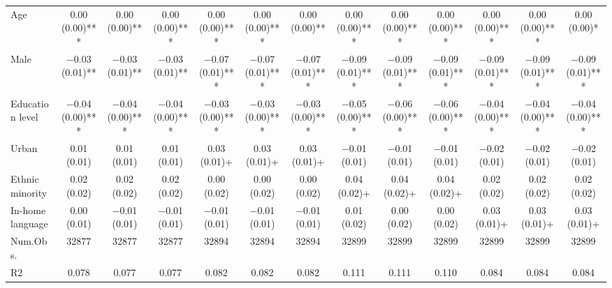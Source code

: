 \begin{table}
\begin{tabular}[t]{lcccccccccccc}
Age & \num{0.00} (\num{0.00})*** & \num{0.00} (\num{0.00})** & \num{0.00} (\num{0.00})*** & \num{0.00} (\num{0.00})*** & \num{0.00} (\num{0.00})*** & \num{0.00} (\num{0.00})** & \num{0.00} (\num{0.00})*** & \num{0.00} (\num{0.00})*** & \num{0.00} (\num{0.00})*** & \num{0.00} (\num{0.00})*** & \num{0.00} (\num{0.00})*** & \num{0.00} (\num{0.00})*\\
Male & \num{-0.03} (\num{0.01})** & \num{-0.03} (\num{0.01})** & \num{-0.03} (\num{0.01})** & \num{-0.07} (\num{0.01})*** & \num{-0.07} (\num{0.01})*** & \num{-0.07} (\num{0.01})*** & \num{-0.09} (\num{0.01})*** & \num{-0.09} (\num{0.01})*** & \num{-0.09} (\num{0.01})*** & \num{-0.09} (\num{0.01})*** & \num{-0.09} (\num{0.01})*** & \num{-0.09} (\num{0.01})***\\
Education level & \num{-0.04} (\num{0.00})*** & \num{-0.04} (\num{0.00})*** & \num{-0.04} (\num{0.00})*** & \num{-0.03} (\num{0.00})*** & \num{-0.03} (\num{0.00})*** & \num{-0.03} (\num{0.00})*** & \num{-0.05} (\num{0.00})*** & \num{-0.06} (\num{0.00})*** & \num{-0.06} (\num{0.00})*** & \num{-0.04} (\num{0.00})*** & \num{-0.04} (\num{0.00})*** & \num{-0.04} (\num{0.00})***\\
Urban & \num{0.01} (\num{0.01}) & \num{0.01} (\num{0.01}) & \num{0.01} (\num{0.01}) & \num{0.03} (\num{0.01})+ & \num{0.03} (\num{0.01})+ & \num{0.03} (\num{0.01})+ & \num{-0.01} (\num{0.01}) & \num{-0.01} (\num{0.01}) & \num{-0.01} (\num{0.01}) & \num{-0.02} (\num{0.01}) & \num{-0.02} (\num{0.01}) & \num{-0.02} (\num{0.01})\\
Ethnic minority & \num{0.02} (\num{0.02}) & \num{0.02} (\num{0.02}) & \num{0.02} (\num{0.02}) & \num{0.00} (\num{0.02}) & \num{0.00} (\num{0.02}) & \num{0.00} (\num{0.02}) & \num{0.04} (\num{0.02})+ & \num{0.04} (\num{0.02})+ & \num{0.04} (\num{0.02})+ & \num{0.02} (\num{0.02}) & \num{0.02} (\num{0.02}) & \num{0.02} (\num{0.02})\\
In-home language & \num{0.00} (\num{0.01}) & \num{-0.01} (\num{0.01}) & \num{-0.01} (\num{0.01}) & \num{-0.01} (\num{0.01}) & \num{-0.01} (\num{0.01}) & \num{-0.01} (\num{0.01}) & \num{0.01} (\num{0.02}) & \num{0.00} (\num{0.02}) & \num{0.00} (\num{0.02}) & \num{0.03} (\num{0.01})+ & \num{0.03} (\num{0.01})+ & \num{0.03} (\num{0.01})+\\
\midrule
Num.Obs. & \num{32877} & \num{32877} & \num{32877} & \num{32894} & \num{32894} & \num{32894} & \num{32899} & \num{32899} & \num{32899} & \num{32899} & \num{32899} & \num{32899}\\
R2 & \num{0.078} & \num{0.077} & \num{0.077} & \num{0.082} & \num{0.082} & \num{0.082} & \num{0.111} & \num{0.111} & \num{0.110} & \num{0.084} & \num{0.084} & \num{0.084}\\

\end{tabular}
\end{table}
